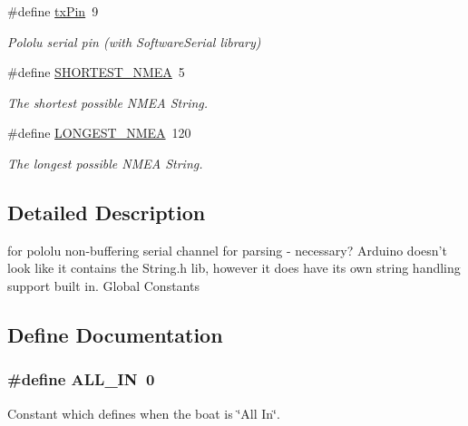 \begin{DoxyCompactItemize}
\#define \hyperlink{group__globalconstants_ga38340aff22e726c77f9cf87b5bea10dd}{tx\-Pin}~9
\begin{DoxyCompactList}\small\item\em \-Pololu serial pin (with \-Software\-Serial library) \end{DoxyCompactList}\item 
\#define \hyperlink{group__globalconstants_gac6759acd1da41c55495c6e5ee91e86e9}{\-S\-H\-O\-R\-T\-E\-S\-T\-\_\-\-N\-M\-E\-A}~5
\begin{DoxyCompactList}\small\item\em \-The shortest possible \-N\-M\-E\-A \-String. \end{DoxyCompactList}\item 
\#define \hyperlink{group__globalconstants_ga0038dced6b4ccdfe2ef833cc1965ca73}{\-L\-O\-N\-G\-E\-S\-T\-\_\-\-N\-M\-E\-A}~120
\begin{DoxyCompactList}\small\item\em \-The longest possible \-N\-M\-E\-A \-String. \end{DoxyCompactList}\end{DoxyCompactItemize}


\subsection{\-Detailed \-Description}
for pololu non-\/buffering serial channel for parsing -\/ necessary? \-Arduino doesn't look like it contains the \-String.\-h lib, however it does have its own string handling support built in. \-Global \-Constants 

\subsection{\-Define \-Documentation}
\hypertarget{group__globalconstants_gaaadbf956e6981264e6bf369a08269821}{
\subsubsection[{\-A\-L\-L\-\_\-\-I\-N}]{\setlength{\rightskip}{0pt plus 5cm}\#define \-A\-L\-L\-\_\-\-I\-N~0}}
\label{group__globalconstants_gaaadbf956e6981264e6bf369a08269821}


\-Constant which defines when the boat is \char`\"{}\-All In\char`\"{}. 



